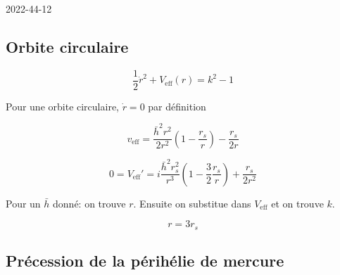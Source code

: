 


2022-44-12

\subsection*{Orbite circulaire}

$$\frac{1}{2} \dot r^{2} + V_{\text{eff}}(r) = k^2-1 $$ 

Pour une orbite circulaire, $\dot r = 0$ par définition 

$$v_{\text{eff}} = \frac{\bar h^{2}r^{2}}{2 r^2} \left( 1 - \frac{r_s}{r}  \right) - \frac{r_s}{2r}   $$ 


$$0 = V_{\text{eff}}' =i \frac{\bar h^{2}r_s^{2}}{r^3} \left( 1 - \frac{3}{2} \frac{r_s}{r}  \right) + \frac{r_s}{2r^{2}}  $$ 

Pour un $\bar h$ donné: on trouve $r$. Ensuite on substitue dans $ V_{\text{eff}} $ et on trouve $k$.

$$r = 3r_s$$ 


\subsection*{Précession de la périhélie de mercure}




